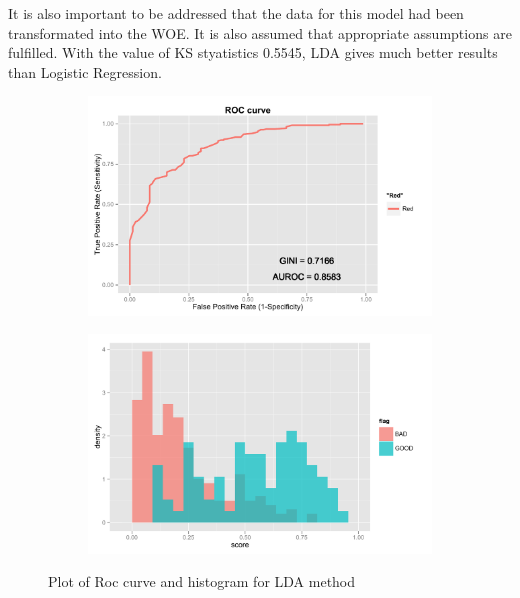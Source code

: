 \documentclass[10pt]{article}\usepackage[]{graphicx}\usepackage[]{color}
\begin{document}
 It is also important to be addressed that the data for this model had been transformated into the WOE. It is also assumed that appropriate assumptions are fulfilled. With the value of KS styatistics 0.5545, LDA gives much better results than Logistic Regression. 

\begin{figure}[h!]
        \centering
        \begin{subfigure}[b]{0.45\textwidth}
                \includegraphics[width=\textwidth]{Plots/ROC_LDA}
                \caption{}
                \label{fig:ROC_ LDA}
        \end{subfigure}
        \begin{subfigure}[b]{0.45\textwidth}
                \includegraphics[width=\textwidth]{Plots/HIST_LDA}
                \label{fig:HIST_ LDA}
        \end{subfigure}

        \caption{Plot of Roc curve and histogram for LDA method}\label{fig:LDA}
\end{figure}
\end{document}
